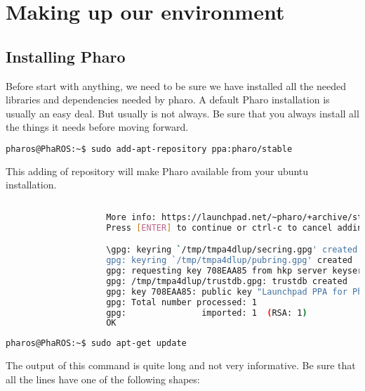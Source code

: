 \documentclass[a4paper,10pt,twoside]{book}
\begin{document}
\fi
\sloppy
\chapter{Making up our environment}
			
			\section{Installing Pharo}
				Before start with anything, we need to be sure we have installed all the needed libraries and dependencies needed by pharo.  A default Pharo installation is usually an easy deal. But usually is not always. 
				Be sure that you always install all the things it needs before moving forward.  
				
				\begin{lstlisting}[language=bash,title={\installationTool{} Installing Pharo PPA }]
					pharos@PhaROS:~$ sudo add-apt-repository ppa:pharo/stable
				\end{lstlisting}
				
				This adding of repository will make Pharo available from your ubuntu installation.
				
				\begin{lstlisting}[language=bash,title={\installationTool{} Installing Pharo PPA - Output }]
				
					More info: https://launchpad.net/~pharo/+archive/stable
					Press [ENTER] to continue or ctrl-c to cancel adding it

					\gpg: keyring `/tmp/tmpa4dlup/secring.gpg' created
					gpg: keyring `/tmp/tmpa4dlup/pubring.gpg' created
					gpg: requesting key 708EAA85 from hkp server keyserver.ubuntu.com
					gpg: /tmp/tmpa4dlup/trustdb.gpg: trustdb created
					gpg: key 708EAA85: public key "Launchpad PPA for Pharo" imported
					gpg: Total number processed: 1
					gpg:               imported: 1  (RSA: 1)
					OK
				\end{lstlisting}
				


				\begin{lstlisting}[language=bash,title={\installationTool{} Apt-get Update }]
					pharos@PhaROS:~$ sudo apt-get update
				\end{lstlisting}
				
				The output of this command is quite long and not very informative. Be sure that all the lines have one of the following shapes:
					
\end{document}
